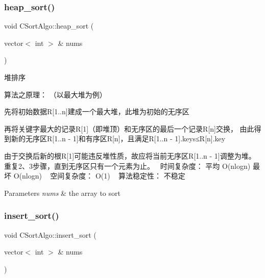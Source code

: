 \subsubsection{\texorpdfstring{heap\+\_\+sort()}{heap\_sort()}}
{\footnotesize\ttfamily void C\+Sort\+Algo\+::heap\+\_\+sort (\begin{DoxyParamCaption}\item[{vector$<$ int $>$ \&}]{nums }\end{DoxyParamCaption})\hspace{0.3cm}{\ttfamily [private]}}



堆排序 

算法之原理： （以最大堆为例）
\begin{DoxyEnumerate}
\item 先将初始数据R\mbox{[}1..n\mbox{]}建成一个最大堆，此堆为初始的无序区
\item 再将关键字最大的记录R\mbox{[}1\mbox{]}（即堆顶）和无序区的最后一个记录R\mbox{[}n\mbox{]}交换， 由此得到新的无序区R\mbox{[}1..n -\/ 1\mbox{]}和有序区R\mbox{[}n\mbox{]}，且满足R\mbox{[}1..n -\/ 1\mbox{]}.keys≤R\mbox{[}n\mbox{]}.key
\item 由于交换后新的根R\mbox{[}1\mbox{]}可能违反堆性质，故应将当前无序区R\mbox{[}1..n -\/ 1\mbox{]}调整为堆。 重复2、3步骤，直到无序区只有一个元素为止。~\newline
时间复杂度： 平均 O(nlogn) 最坏 O(nlogn) ~\newline
空间复杂度： O(1) ~\newline
算法稳定性： 不稳定 ~\newline

\begin{DoxyParams}{Parameters}
{\em nums} & the array to sort \\
\hline
\end{DoxyParams}

\end{DoxyEnumerate}\hypertarget{class_c_sort_algo_a3095752baa5f6d51934e89baf62d7361}{}\label{class_c_sort_algo_a3095752baa5f6d51934e89baf62d7361} 
\subsubsection{\texorpdfstring{insert\+\_\+sort()}{insert\_sort()}}
{\footnotesize\ttfamily void C\+Sort\+Algo\+::insert\+\_\+sort (\begin{DoxyParamCaption}\item[{vector$<$ int $>$ \&}]{nums }\end{DoxyParamCaption})\hspace{0.3cm}{\ttfamily [private]}}



